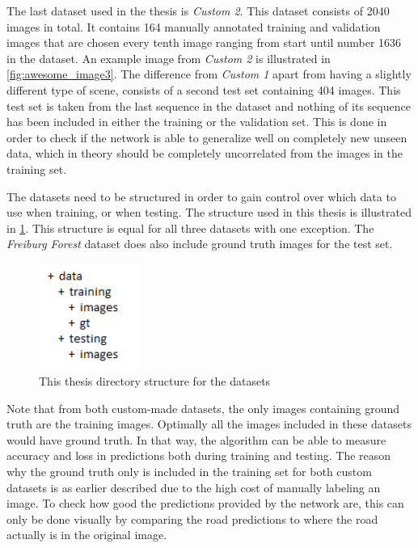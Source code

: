 \documentclass[USenglish]{ifimaster}  %
\begin{document}
The last dataset used in the thesis is \textit{Custom 2}. This dataset consists of 2040 images in total. It contains 164 manually annotated training and validation images that are chosen every tenth image ranging from start until number 1636 in the dataset. An example image from \textit{Custom 2} is illustrated in \cref{fig:awesome_image3}. The difference from \textit{Custom 1} apart from having a slightly different type of scene, consists of a second test set containing 404 images. This test set is taken from the last sequence in the dataset and nothing of its sequence has been included in either the training or the validation set. This is done in order to check if the network is able to generalize well on completely new unseen data, which in theory should be completely uncorrelated from the images in the training set.

The datasets need to be structured in order to gain control over which data to use when training, or when testing. The structure used in this thesis is illustrated in \cref{fig:dataset_structure}. This structure is equal for all three datasets with one exception. The \textit{Freiburg Forest} dataset does also include ground truth images for the test set.

\begin{figure}[ht]
    \centering
    \includegraphics[width=0.3\textwidth]{bilder/dataset_structure.PNG}
    \caption{This thesis directory structure for the datasets}
    \label{fig:dataset_structure}
\end{figure}
Note that from both custom-made datasets, the only images containing ground truth are the training images. Optimally all the images included in these datasets would have ground truth. In that way, the algorithm can be able to measure accuracy and loss in predictions both during training and testing. The reason why the ground truth only is included in the training set for both custom datasets is as earlier described due to the high cost of manually labeling an image. To check how good the predictions provided by the network are, this can only be done visually by comparing the road predictions to where the road actually is in the original image.
\end{document}
